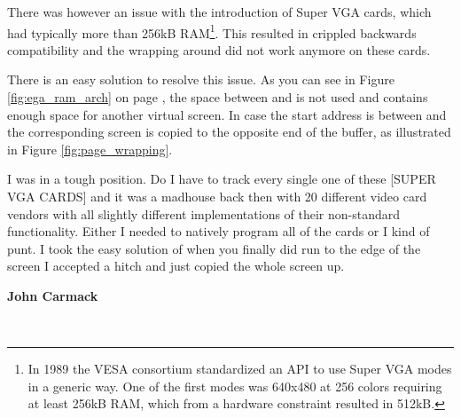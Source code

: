 \documentclass[book.tex]{subfiles}
\begin{document}
\par
There was however an issue with the introduction of Super VGA cards, which had typically more than 256kB RAM\footnote{In 1989 the VESA consortium standardized an API to use Super VGA modes in a generic way. One of the first modes was 640x480 at 256 colors requiring at least 256kB RAM, which from a hardware constraint resulted in 512kB.}. This resulted in crippled backwards compatibility and the wrapping around  did not work anymore on these cards. \\
\par
There is an easy solution to resolve this issue. As you can see in Figure \ref{fig:ega_ram_arch} on page \pageref{fig:ega_ram_arch}, the space between  and  is not used and contains enough space for another virtual screen. In case the start address is between  and  the corresponding screen is copied to the opposite end of the buffer, as illustrated in Figure \ref{fig:page_wrapping}.\\

\par

\begin{fancyquotes}
I was in a tough position. Do I have to track every single one of these [SUPER VGA CARDS] and it was a madhouse back then with 20 different video card vendors with all slightly different implementations of their non-standard functionality. Either I needed to natively program all of the cards or I kind of punt. I took the easy solution of when you finally did run to the edge of the screen I accepted a hitch and just copied the whole screen up.\\
\par
\textbf{John Carmack\protect\footnotemark}
\end{fancyquotes}\\
\addtocounter{footnote}{-1}
\end{document}

